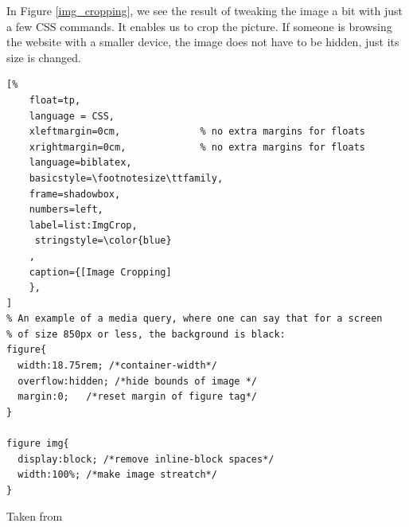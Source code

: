 In Figure \ref{img_cropping}, we see the result of
tweaking the image a bit with just a few CSS commands. It enables us 
to crop the picture. If someone is browsing the website with a
smaller device, the image does not have to be hidden, just its size is
changed.

\begin{lstlisting}[%
    float=tp,
    language = CSS, 
    xleftmargin=0cm,              % no extra margins for floats
    xrightmargin=0cm,             % no extra margins for floats
    language=biblatex,
    basicstyle=\footnotesize\ttfamily,
    frame=shadowbox,
    numbers=left,
    label=list:ImgCrop,
     stringstyle=\color{blue}
    ,
    caption={[Image Cropping]
    },
]
% An example of a media query, where one can say that for a screen 
% of size 850px or less, the background is black:
figure{
  width:18.75rem; /*container-width*/
  overflow:hidden; /*hide bounds of image */
  margin:0;   /*reset margin of figure tag*/
}

figure img{
  display:block; /*remove inline-block spaces*/
  width:100%; /*make image streatch*/
}
\end{lstlisting}
Taken from
